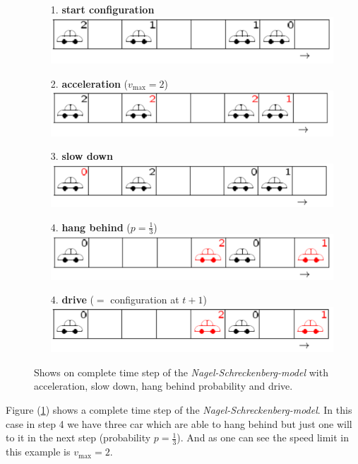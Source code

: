\documentclass[11pt]{article}
\begin{document}
\begin{figure}[h!]
\begin{itemize}
\item[1.] \textbf{start configuration} \\
\includegraphics[width=\textwidth]{config_1.png}
\item[2.] \textbf{acceleration} ($v_{\mathrm{max}}=2$) \\
\includegraphics[width=\textwidth]{config_2.png}
\item[3.] \textbf{slow down} \\
\includegraphics[width=\textwidth]{config_3.png}
\item[4.] \textbf{hang behind} ($p=\frac{1}{3}$) \\
\includegraphics[width=\textwidth]{config_4.png}
\item[4.] \textbf{drive} ($=$ configuration at $t+1$) \\
\includegraphics[width=\textwidth]{config_5.png}
\end{itemize}
\caption{Shows on complete time step of the \textit{Nagel-Schreckenberg-model} with acceleration, slow down, hang behind probability and drive.}
\label{example_ns} 
\end{figure}
Figure (\ref{example_ns}) shows a complete time step of the \textit{Nagel-Schreckenberg-model}. In this case in step 4 we have three car which are able to hang behind but just one will to it in the next step (probability $p=\frac{1}{3}$). And as one can see the speed limit in this example is $v_\mathrm{max}=2$.
\end{document}
